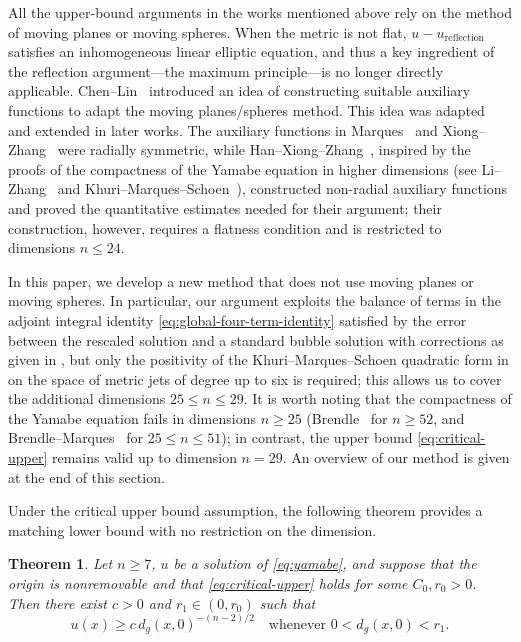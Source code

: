 \documentclass[11pt]{article}
\numberwithin{equation}{section}
\newtheorem{theorem}{Theorem}[section]
\theoremstyle{remark}
\begin{document}
All the upper-bound arguments in the works mentioned above rely on the
method of moving planes or moving spheres. When the metric is not flat,
$u-u_{\mathrm{reflection}}$ satisfies an inhomogeneous linear elliptic
equation, and thus a key ingredient of the reflection argument---the
maximum principle---is no longer directly applicable. Chen--Lin~\cite{ChenLin1997} introduced an idea of constructing suitable auxiliary
functions to adapt the moving planes/spheres method. This idea was adapted and extended in later works. The auxiliary functions in Marques~\cite{f-mar} and
Xiong--Zhang~\cite{x-z-1} were radially symmetric, while
Han--Xiong--Zhang~\cite{HanXiongZhang}, inspired by the proofs of the
compactness of the Yamabe equation in higher dimensions (see
Li--Zhang~\cite{LZII, LZIII} and Khuri--Marques--Schoen~\cite{KMS}), constructed
non-radial auxiliary functions and proved the quantitative estimates needed for their argument; their construction, however, requires a flatness condition and is restricted to dimensions $n\le24$.

In this paper, we develop a new method that does not use moving planes or
moving spheres. In particular, our argument 
exploits the balance of terms in  the adjoint integral identity
\eqref{eq:global-four-term-identity} satisfied by the error between the rescaled solution and a standard bubble solution with corrections as given in \cite{KMS}, but only the positivity
of the Khuri--Marques--Schoen  quadratic form in \cite{KMS} on the space of metric jets of degree up to six is required; this allows us to cover the
additional dimensions $25\le n\le29$. It is worth noting that the
compactness of the Yamabe equation fails in dimensions $n\ge25$
(Brendle~\cite{Bre} for $n\ge52$, and Brendle--Marques~\cite{Bre-Mar} for
$25\le n\le51$); in contrast, the upper bound \eqref{eq:critical-upper}
remains valid up to dimension $n=29$. An overview of our method is given at the end of this section.


Under the critical upper bound assumption, the following theorem provides a matching lower bound with no restriction on the dimension.

\begin{theorem}\label{thm:lower-bound}
Let \(n\ge7\), $u$ be a solution of \eqref{eq:yamabe}, and suppose that the origin is nonremovable and that
\eqref{eq:critical-upper} holds for some \(C_0,r_0>0\). Then there exist
\(c>0\) and \(r_1\in(0,r_0)\) such that
\begin{equation}\label{eq:lower-bound}
 u(x)\ge c\,d_g(x,0)^{-(n-2)/2}
 \quad\text{whenever }0<d_g(x,0)<r_1.
\end{equation}
\end{theorem}
\end{document}
